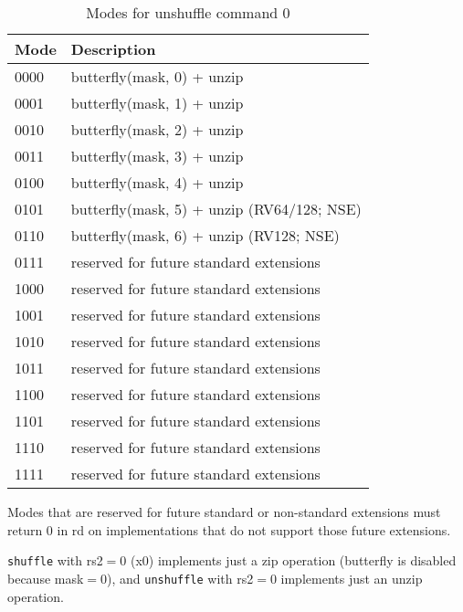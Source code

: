 \begin{table}[h]
\begin{small}
\begin{center}
\begin{tabular}{l l}
Mode & Description \\ \hline

0000 & butterfly(mask, 0) + unzip \\
0001 & butterfly(mask, 1) + unzip \\
0010 & butterfly(mask, 2) + unzip \\
0011 & butterfly(mask, 3) + unzip \\
0100 & butterfly(mask, 4) + unzip \\
0101 & butterfly(mask, 5) + unzip (RV64/128; NSE) \\
0110 & butterfly(mask, 6) + unzip (RV128; NSE) \\
0111 & reserved for future standard extensions \\

\hline

1000 & reserved for future standard extensions \\
1001 & reserved for future standard extensions \\
1010 & reserved for future standard extensions \\
1011 & reserved for future standard extensions \\
1100 & reserved for future standard extensions \\
1101 & reserved for future standard extensions \\
1110 & reserved for future standard extensions \\
1111 & reserved for future standard extensions \\

\hline

\end{tabular}
\end{center}
\end{small}
\caption{Modes for unshuffle command 0}
\label{unshuffle-modes}
\end{table}

Modes that are reserved for future standard or non-standard extensions must return
0 in rd on implementations that do not support those future extensions.

\texttt{shuffle} with rs2$=$0 (x0) implements just a zip operation (butterfly is
disabled because mask$=$0), and \texttt{unshuffle} with rs2$=$0 implements just
an unzip operation.


